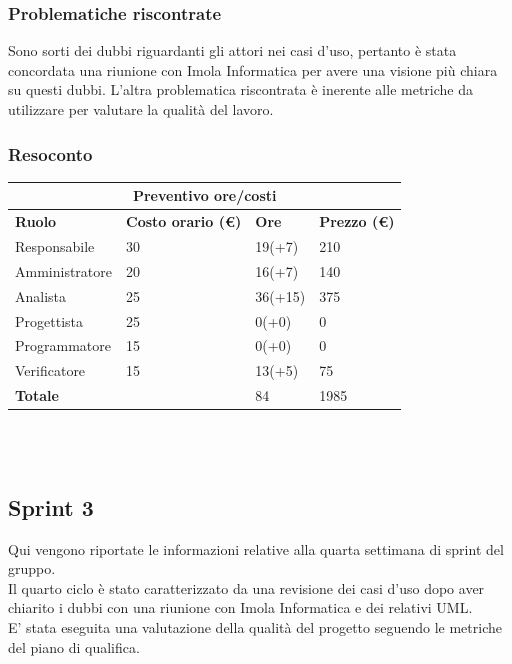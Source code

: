 \documentclass[12pt]{article}
\begin{document}
\subsubsection{Problematiche riscontrate}
Sono sorti dei dubbi riguardanti gli attori nei casi d'uso, pertanto è stata concordata una riunione con Imola Informatica per avere una visione più chiara su questi dubbi.
L'altra problematica riscontrata è inerente alle metriche da utilizzare per valutare la qualità del lavoro.
\subsubsection{Resoconto}
\begin{center}
	\begin{tabularx}{\textwidth}{|X|X|X|X|}
		\hline
		\multicolumn{4}{|c|}{\textbf{Preventivo ore/costi}}                                      \\
		\hline
		\hline
		\textbf{Ruolo}  & \textbf{Costo orario (\euro)} & \textbf{Ore} & \textbf{Prezzo (\euro)} \\
		\hline
		Responsabile    & 30                            & 19(+7)       & 210                     \\
		\hline
		Amministratore  & 20                            & 16(+7)       & 140                     \\
		\hline
		Analista        & 25                            & 36(+15)      & 375                     \\
		\hline
		Progettista     & 25                            & 0(+0)        & 0                       \\
		\hline
		Programmatore   & 15                            & 0(+0)        & 0                       \\
		\hline
		Verificatore    & 15                            & 13(+5)       & 75                      \\
		\hline
		\hline
		\textbf{Totale} &                               & 84           & 1985                    \\
		\hline
	\end{tabularx}\\[8pt]
	\mbox{}\\
\end{center}


\subsection{Sprint 3}
Qui vengono riportate le informazioni relative alla quarta settimana di sprint del gruppo. \\
Il quarto ciclo è stato caratterizzato da una revisione dei casi d'uso dopo aver chiarito i dubbi con una riunione con Imola Informatica e dei relativi UML.\\
E' stata eseguita una valutazione della qualità del progetto seguendo le metriche del piano di qualifica.
\end{document}
